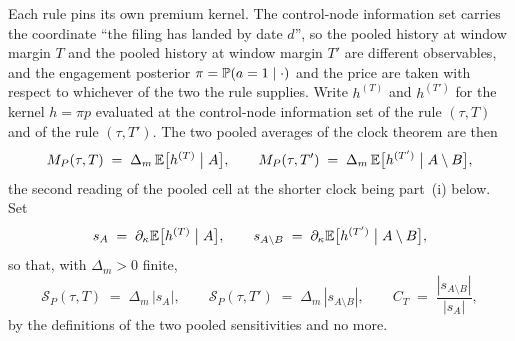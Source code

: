 Each rule pins its own premium kernel. The control-node information set carries the coordinate
``the filing has landed by date $d$'', so the pooled history at window margin $T$ and the pooled
history at window margin $T'$ are different observables, and the engagement posterior
$\pi = \mathbb{P}(a = 1 \mid \cdot)$ and the price are taken with respect to whichever of the two the
rule supplies. Write $h^{(T)}$ and $h^{(T')}$ for the kernel $h = \pi p$ evaluated at the
control-node information set of the rule $(\tau,T)$ and of the rule $(\tau,T')$. The two pooled
averages of the clock theorem are then
\begin{equation}
\label{eq:caught-MP}
M_P(\tau,T) \;=\; \Delta_m\,\mathbb{E}\bigl[h^{(T)} \bigm| A\bigr],
\qquad
M_P(\tau,T') \;=\; \Delta_m\,\mathbb{E}\bigl[h^{(T')} \bigm| A\setminus B\bigr],
\end{equation}
the second reading of the pooled cell at the shorter clock being part~(i) below. Set
\begin{equation}
\label{eq:caught-sens}
s_A \;=\; \partial_\kappa\mathbb{E}\bigl[h^{(T)} \bigm| A\bigr],
\qquad
s_{A\setminus B} \;=\; \partial_\kappa\mathbb{E}\bigl[h^{(T')} \bigm| A\setminus B\bigr],
\end{equation}
so that, with $\Delta_m > 0$ finite,
\begin{equation}
\label{eq:caught-SP}
\mathcal{S}_P(\tau,T) \;=\; \Delta_m\,|s_A|,
\qquad
\mathcal{S}_P(\tau,T') \;=\; \Delta_m\,|s_{A\setminus B}|,
\qquad
C_T \;=\; \frac{|s_{A\setminus B}|}{|s_A|} ,
\end{equation}
by the definitions of the two pooled sensitivities and no more.

